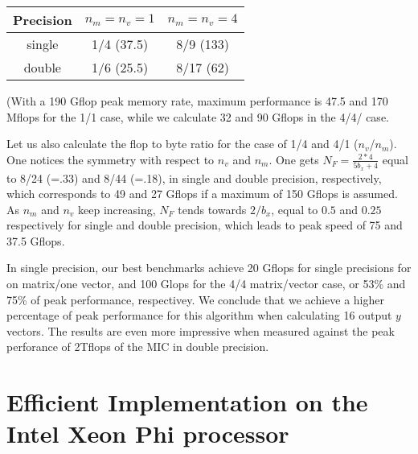\documentclass[10pt, conference, compsocconf]{IEEEtran}
\begin{document}
\begin{center}
\begin{tabular}{|c|c|c|}
\hline
Precision & $n_m=n_v=1$ & $n_m=n_v=4$     \\
\hline
single    &  1/4  (37.5)     &   8/9 (133) \\
double    &  1/6  (25.5)     &   8/17 (62) \\
\hline
\end{tabular}
\end{center}
(With a 190 Gflop peak memory rate, maximum performance is 47.5 and 170 Mflops for the 1/1 case, while we calculate 32 and 90 Gflops in the 4/4/ case. 

Let us also calculate the flop to byte ratio for the case of 1/4 and 4/1 ($n_v$/$n_m$). One notices the symmetry with respect to $n_v$ and $n_m$. 
One gets $N_F = \frac{2*4}{5 b_x + 4}$ equal to 8/24 (=.33) and 8/44 (=.18), in single and double precision, respectively, which corresponds to 49 and 27 Gflops if a maximum of 150 Gflops is assumed.
As $n_m$ and $n_v$ keep increasing, $N_F$ tends towards $2/b_x$, equal to $0.5$ and $0.25$ respectively for single and double precision, which leads to peak speed of 75 and 37.5 Gflops.

In single precision, our best benchmarks achieve 20 Gflops for single precisions for on matrix/one vector, and 100 Glops for the 4/4 matrix/vector case, or 53\% and 75\% of peak performance, respectivey. We conclude that we achieve a higher percentage of peak performance for this algorithm when calculating 16 output $y$ vectors. The results are even more impressive when measured against the peak perforance of 2Tflops of the MIC in double precision.








\section{Efficient Implementation on the Intel Xeon Phi processor}
\label{sec:impl}
\end{document}
